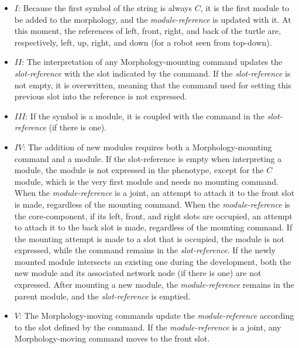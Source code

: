\documentclass[utf8]{frontiersSCNS} %
\begin{document}
\begin{itemize}

 \item \textbf{$I$}: Because the first symbol of the string is always $C$, it is the first module to be added to the morphology, and the \textit{module-reference} is updated with it. At this moment, the references of left, front, right, and back of the turtle are, respectively, left, up, right, and down (for a robot seen from top-down). 

 \item \textbf{$II$}: The interpretation of any Morphology-mounting command updates the \textit{slot-reference} with the slot indicated by the command. If the \textit{slot-reference} is not empty, it is overwritten, meaning that the command used for setting this previous slot into the reference is not expressed.  
 
 \item \textbf{$III$}: If the symbol is a module, it is coupled with the command in the \textit{slot-reference} (if there is one).

 \item \textbf{$IV$}: The addition of new modules requires both a Morphology-mounting command and a module. If the slot-reference is empty when interpreting a module, the module is not expressed in the phenotype, except for the $C$ module, which is the very first module and needs no mounting command. When the \textit{module-reference} is a joint, an attempt to attach it to the front slot is made, regardless of the mounting command. When the \textit{module-reference} is the core-component, if its left, front, and right slots are occupied, an attempt to attach it to the back slot is made, regardless of the mounting command. If the mounting attempt is made to a slot that is occupied, the module is not expressed, while the command remains in the \textit{slot-reference}. If the newly mounted module intersects an existing one during the development, both the new module and its associated network node (if there is one) are not expressed. After mounting a new module, the \textit{module-reference} remains in the parent module, and the \textit{slot-reference} is emptied.  
 
 
 
 \item \textbf{$V$}: The Morphology-moving commands update the \textit{module-reference} according to the slot defined by the command. If the \textit{module-reference} is a joint, any Morphology-moving command moves to the front slot.


\end{itemize}
\end{document}
